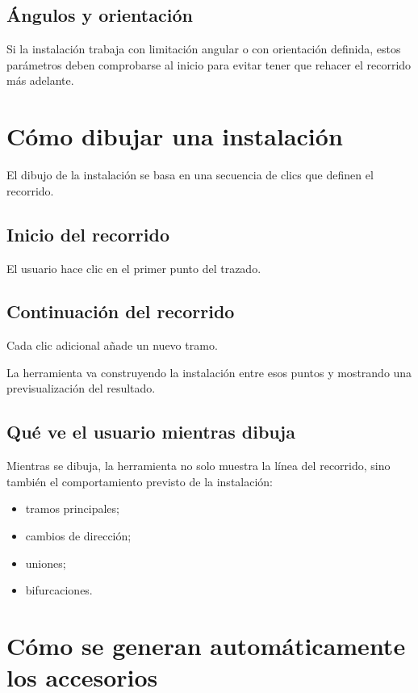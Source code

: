 \subsection{Ángulos y orientación}

Si la instalación trabaja con limitación angular o con orientación definida, estos parámetros deben comprobarse al inicio para evitar tener que rehacer el recorrido más adelante.

\section{Cómo dibujar una instalación}

El dibujo de la instalación se basa en una secuencia de clics que definen el recorrido.

\subsection{Inicio del recorrido}

El usuario hace clic en el primer punto del trazado.

\subsection{Continuación del recorrido}

Cada clic adicional añade un nuevo tramo.

La herramienta va construyendo la instalación entre esos puntos y mostrando una previsualización del resultado.

\subsection{Qué ve el usuario mientras dibuja}

Mientras se dibuja, la herramienta no solo muestra la línea del recorrido, sino también el comportamiento previsto de la instalación:

\begin{itemize}
\item tramos principales;
\item cambios de dirección;
\item uniones;
\item bifurcaciones.
\end{itemize}


\section{Cómo se generan automáticamente los accesorios}

